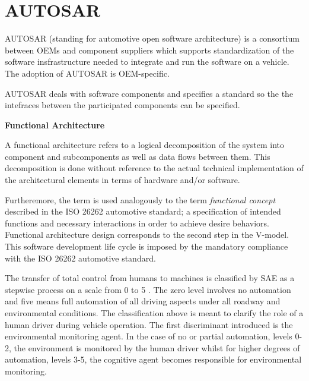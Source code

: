 \section{AUTOSAR}
\label{autosar}

AUTOSAR (standing for automotive open software architecture) is a consortium between OEMs and component suppliers
which supports standardization of the software insfrastructure needed to integrate and run the software on a vehicle. 
The adoption of AUTOSAR is OEM-specific. 

AUTOSAR deals with software components and specifies a standard so the the intefraces between the participated
components can be specified.


\begin{framed}
\theoremstyle{remark}
\begin{remark}{\textbf{Functional Architecture}}

A functional architecture refers to a logical decomposition of the system into component and subcomponents as well as data flows between them.  
This decomposition is done without reference to the actual technical implementation of the architectural elements in terms of hardware and/or software.

Furtheremore, the term is used analogously to the term {\em functional concept} described in the ISO 26262 automotive standard; a specification
of intended functions and necessary interactions in order to achieve desire behaviors. Functional architecture design corresponds to the second
step in the V-model. This software development life cycle is imposed by the mandatory compliance with the ISO 26262 automotive standard.

\end{remark}
\end{framed}

The transfer of total control from humans to machines is classified by SAE as a stepwise process on a scale from 0 to 5 \cite{Serban}.
The zero level involves no automation and five means full automation of all driving aspects under all roadway and environmental conditions.
The classification above is meant to clarify the role of a human driver during vehicle operation. The first discriminant introduced is the 
environmental monitoring agent. In the case of no or partial automation, levels 0-2, the environment is monitored by the human driver whilst for higher
degrees of automation, levels 3-5, the cognitive agent becomes responsible for environmental monitoring.


